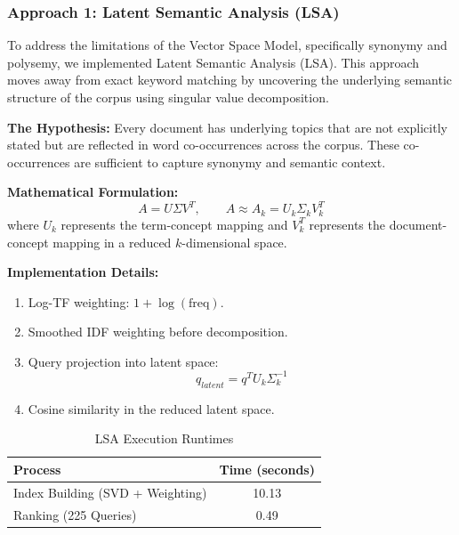 \subsubsection{Approach 1: Latent Semantic Analysis (LSA)}
To address the limitations of the Vector Space Model, specifically synonymy and polysemy, we implemented Latent Semantic Analysis (LSA). This approach moves away from exact keyword matching by uncovering the underlying semantic structure of the corpus using singular value decomposition.

\textbf{The Hypothesis:} Every document has underlying topics that are not explicitly stated but are reflected in word co-occurrences across the corpus. These co-occurrences are sufficient to capture synonymy and semantic context.

\textbf{Mathematical Formulation:}
\[
A = U \Sigma V^T, \qquad A \approx A_k = U_k \Sigma_k V_k^T
\]
where $U_k$ represents the term-concept mapping and $V_k^T$ represents the document-concept mapping in a reduced $k$-dimensional space.

\textbf{Implementation Details:}
\begin{enumerate}
    \item Log-TF weighting: $1 + \log(\text{freq})$.
    \item Smoothed IDF weighting before decomposition.
    \item Query projection into latent space:
    \[
    q_{latent} = q^T U_k \Sigma_k^{-1}
    \]
    \item Cosine similarity in the reduced latent space.
\end{enumerate}

\begin{table}[H]
\centering
\begin{tabular}{|l|c|}
\hline
\textbf{Process} & \textbf{Time (seconds)} \\ \hline
Index Building (SVD + Weighting) & 10.13 \\ \hline
Ranking (225 Queries) & 0.49 \\ \hline
\end{tabular}
\caption{LSA Execution Runtimes}
\end{table}


